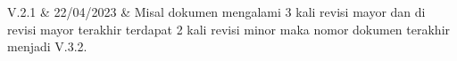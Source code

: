 {V.2.1}					&	%
{22/04/2023}			&	%
{\noindent					%
    Misal dokumen mengalami 3 kali revisi mayor dan di revisi mayor terakhir terdapat 2 kali revisi minor maka nomor dokumen terakhir menjadi V.3.2.
}